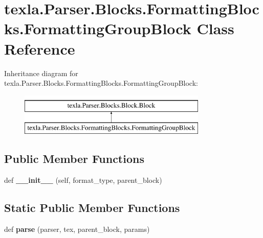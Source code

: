 \hypertarget{classtexla_1_1Parser_1_1Blocks_1_1FormattingBlocks_1_1FormattingGroupBlock}{}\section{texla.\+Parser.\+Blocks.\+Formatting\+Blocks.\+Formatting\+Group\+Block Class Reference}
\label{classtexla_1_1Parser_1_1Blocks_1_1FormattingBlocks_1_1FormattingGroupBlock}
Inheritance diagram for texla.\+Parser.\+Blocks.\+Formatting\+Blocks.\+Formatting\+Group\+Block\+:\begin{figure}[H]
\begin{center}
\leavevmode
\includegraphics[height=2.000000cm]{classtexla_1_1Parser_1_1Blocks_1_1FormattingBlocks_1_1FormattingGroupBlock}
\end{center}
\end{figure}
\subsection*{Public Member Functions}
\begin{DoxyCompactItemize}
\item 
\hypertarget{classtexla_1_1Parser_1_1Blocks_1_1FormattingBlocks_1_1FormattingGroupBlock_af1a0e6710404f1f8f4e98d4abf8a99c7}{}\label{classtexla_1_1Parser_1_1Blocks_1_1FormattingBlocks_1_1FormattingGroupBlock_af1a0e6710404f1f8f4e98d4abf8a99c7} 
def {\bfseries \+\_\+\+\_\+init\+\_\+\+\_\+} (self, format\+\_\+type, parent\+\_\+block)
\end{DoxyCompactItemize}
\subsection*{Static Public Member Functions}
\begin{DoxyCompactItemize}
\item 
\hypertarget{classtexla_1_1Parser_1_1Blocks_1_1FormattingBlocks_1_1FormattingGroupBlock_a56fb6ea61a4e73c09f415de85e3c59e4}{}\label{classtexla_1_1Parser_1_1Blocks_1_1FormattingBlocks_1_1FormattingGroupBlock_a56fb6ea61a4e73c09f415de85e3c59e4} 
def {\bfseries parse} (parser, tex, parent\+\_\+block, params)
\end{DoxyCompactItemize}
